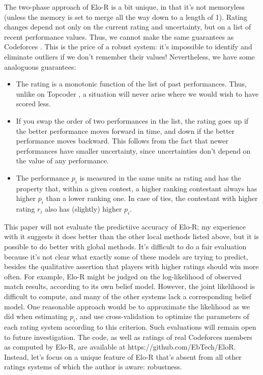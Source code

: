 \documentclass{article}
\begin{document}
The two-phase approach of Elo-R is a bit unique, in that it's not memoryless (unless the memory is set to merge all the way down to a length of 1). Rating changes depend not only on the current rating and uncertainty, but on a list of recent performance values. Thus, we cannot make the same guarantees as Codeforces \cite{Codeforces}. This is the price of a robust system: it's impossible to identify and eliminate outliers if we don't remember their values! Nevertheless, we have some analoguous guarantees:
\begin{itemize}
\item The rating is a monotonic function of the list of past performances. Thus, unlike on Topcoder \cite{forivsektheoretical}, a situation will never arise where we would wish to have scored less.
\item If you swap the order of two performances in the list, the rating goes up if the better performance moves forward in time, and down if the better performance moves backward. This follows from the fact that newer performances have smaller uncertainty, since uncertainties don't depend on the value of any performance.
\item The performance $p_i$ is measured in the same units as rating and has the property that, within a given contest, a higher ranking contestant always has higher $p_i$ than a lower ranking one. In case of ties, the contestant with higher rating $r_i$ also has (slightly) higher $p_i$.
\end{itemize}

This paper will not evaluate the predictiive accuracy of Elo-R; my experience with it suggests it does better than the other local methods listed above, but it is possible to do better with global methods. It's difficult to do a fair evaluation because it's not clear what exactly some of these models are trying to predict, besides the qualitative assertion that players with higher ratings should win more often. For example, Elo-R might be judged on the log-likelihood of observed match results, according to its own belief model. However, the joint likelihood is difficult to compute, and many of the other systems lack a corresponding belief model. One reasonable approach would be to approximate the likelihood as we did when estimating $p_i$, and use cross-validation to optimize the parameters of each rating system according to this criterion. Such evaluations will remain open to future investigation. The code, as well as ratings of real Codeforces members as computed by Elo-R, are available at https://github.com/EbTech/EloR. Instead, let's focus on a unique feature of Elo-R that's absent from all other ratings systems of which the author is aware: robustness.
\end{document}

